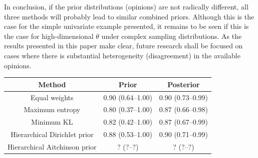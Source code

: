 \documentclass[a4paper, notitlepage, 10pt]{article}
\begin{document}
In conclusion, if the prior distributions (opinions) are not radically different, all three methods will probably lead to similar combined priors.
Although this is the case for the simple univariate example presented, it remains to be seen if this is the case for high-dimensional $\theta$ under complex sampling distributions.
As the results presented in this paper make clear, future research shall be focused on cases where there is substantial heterogeneity (disagreement) in the available opinions.

\begin{table}[ht]
\centering
\begin{tabular}{ccc}
 \hline
Method & Prior & Posterior  \\ 
 \hline
 Equal weights & 0.90 (0.64--1.00) & 0.90 (0.73--0.99) \\ 
 Maximum entropy & 0.80 (0.37--1.00) & 0.87 (0.66--0.98) \\ 
 Minimum KL  & 0.82 (0.42--1.00) & 0.87 (0.67--0.99) \\ 
 Hierarchical Dirichlet prior & 0.88 (0.53--1.00) & 0.90 (0.71--0.99) \\ 
 Hierarchical Aitchinson prior & ? (?--?) & ? (?--?) \\ 
  \hline
\end{tabular}
\label{tab:prior_posteriorsBeta}
\end{table}





\end{document}
